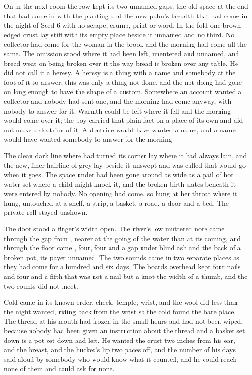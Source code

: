 On  in the next room the row kept its two unnamed gaps, the old space at the end that had come in with the planting and the new palm's breadth that had come in the night of Seed 6 with no scrape, crumb, print or word. In the fold one brown-edged crust lay stiff with its empty place beside it unnamed and no third. No collector had come for the woman in the brook and the morning had come all the same. The omission stood where it had been left, unentered and unnamed, and bread went on being broken over it the way bread is broken over any table. He did not call it a heresy. A heresy is a thing with a name and somebody at the foot of it to answer; this was only a thing not done, and the not-doing had gone on long enough to have the shape of a custom. Somewhere an account wanted a collector and nobody had sent one, and the morning had come anyway, with nobody to answer for it. Warmth could be left where it fell and the morning would come over it; the boy carried that plain fact on a place of its own and did not make a doctrine of it. A doctrine would have wanted a name, and a name would have wanted somebody to answer for the morning.

The clean dark line where  had turned its corner lay where it had always lain, and the new, finer hairline of grey lay beside it unswept and was called  that would go when it goes. The space under  had been gone around as wide as a pail of hot water set where a child might knock it, and the broken birth-slates beneath it were entered by nobody. No opening had come, so  hung at her throat where it hung, untouched at a shelf, a strip, a basket, a road, a door and a bed. The private roll stayed unshown.

The door stood a finger's width open. The river's low muttered note came through the gap from , nearer at the going of the water than at its coming, and through the floor came , four, four and a gap under blind ash and the back of a broken pot, its payer unnamed. The two sounds came in two separate places as they had come for a hundred and six days. The boards overhead kept four nails and four and a fifth that was not a nail but a knot the width of a thumb, and the two counts did not meet.

Cold came in its known order, cheek, temple, wrist, and the wool did less than the night wanted, riding back from the wrist so the cold found the bare place. The thread at his mouth had frozen in the small hours and had not been wiped, because nobody had been given an instruction about the thread and a basket set down is a pot set down and left. He wanted the crust two inches from his ear, and the breast, and the bucket's lip two paces off, and the number of his days said aloud by somebody who would know what it counted, and he could reach none of them and could ask for none.

